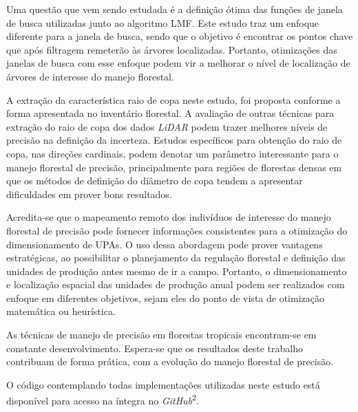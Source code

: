 \documentclass[
	12pt,				%
	openright,			%
	twoside,			%
	a4paper,			%
	chapter=TITLE,		%
	sumario=abnt-6027-2012,
	english,			%
	brazil				%
	]{UFVJM-abntex2}
\newcommand{\li}{\textit{LiDAR }}
\begin{document}
Uma questão que vem sendo estudada é a definição ótima das funções de janela de busca utilizadas junto ao algoritmo LMF. Este estudo traz um enfoque diferente para a janela de busca, sendo que o objetivo é encontrar os pontos chave que após filtragem remeterão às árvores localizadas. Portanto, otimizações das janelas de busca com esse enfoque podem vir a melhorar o nível de localização de árvores de interesse do manejo florestal.

A extração da característica raio de copa neste estudo, foi proposta  conforme a forma apresentada no inventário florestal. A avaliação de outras técnicas para extração do raio de copa dos dados \li podem trazer melhores níveis de precisão na definição da incerteza. Estudos específicos para obtenção do raio de copa, nas direções cardinais, podem denotar um parâmetro interessante para o manejo florestal de precisão, principalmente para regiões de florestas densas em que os métodos de definição do diâmetro de copa tendem a apresentar dificuldades em prover bons resultados.

Acredita-se que  o mapeamento remoto dos indivíduos de interesse do manejo florestal de precisão pode fornecer informações consistentes para a otimização do dimensionamento de UPAs. O uso dessa abordagem pode prover vantagens estratégicas, ao possibilitar o planejamento da regulação florestal e definição das unidades de produção antes mesmo de ir a campo. Portanto, o dimensionamento e localização espacial das unidades de produção anual podem ser realizados com enfoque em diferentes objetivos, sejam eles  do ponto de vista de otimização matemática ou heurística.


As técnicas de manejo de precisão em florestas tropicais encontram-se em constante desenvolvimento. Espera-se que os resultados deste trabalho contribuam de forma prática, com a evolução do manejo florestal de precisão.

O código contemplando todas implementações utilizadas neste estudo está disponível para acesso na íntegra no \textit{GitHub}\textsuperscript{2}.

\let\thefootnote\relax{}
\end{document}

